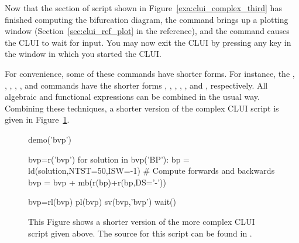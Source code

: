 \documentclass[12pt]{report}
\begin{document}
 Now that the section of script shown in 
 Figure~\ref{exa:clui_complex_third} has finished computing the
 bifurcation diagram, the command 
 brings up a plotting window 
 (Section~\ref{sec:clui_ref_plot} in the reference),
 and the command  causes the \AUTO CLUI
 to wait for input.  You may now exit the \AUTO CLUI
 by pressing any key in the window in which you started
 the \AUTO CLUI.

 For convenience, some of these commands have shorter forms.
 For instance, the , , ,
 , , and  commands
 have the shorter forms , , ,
 , , and , respectively.
 All algebraic and functional expressions can be combined in the
 usual way. Combining these techniques, a shorter version of the complex \AUTO
  CLUI script is given in Figure~\ref{exa:clui_complex_fourth}.

 \begin{figure}[htbp]
 {\small \begin{center} \begin{boxedverbatim}
 demo('bvp')

 bvp=r('bvp')
 for solution in bvp('BP'):
     bp = ld(solution,NTST=50,ISW=-1)
     # Compute forwards and backwards
     bvp = bvp + mb(r(bp)+r(bp,DS='-'))

 bvp=rl(bvp)
 pl(bvp)
 sv(bvp,'bvp')
 wait()
 \end{boxedverbatim}
 \end{center} 
 }
 \caption[A complex example of a \AUTO CLUI script.]
 {This Figure shows a shorter version of the more complex \AUTO CLUI
   script given above.
 The source for this script can be found in .
 }
 \label{exa:clui_complex_fourth}
 \end{figure}
\end{document}
